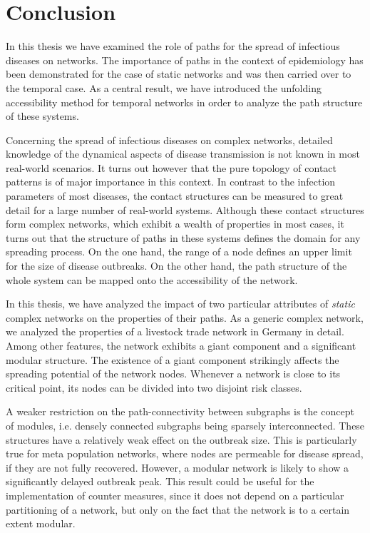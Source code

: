 \chapter{Conclusion}
In this thesis we have examined the role of paths for the spread of infectious diseases on networks.
The importance of paths in the context of epidemiology has been demonstrated for the case of static networks and was then carried over to the temporal case.
As a central result, we have introduced the unfolding accessibility method for temporal networks in order to analyze the path structure of these systems.

Concerning the spread of infectious diseases on complex networks, detailed knowledge of the dynamical aspects of disease transmission is not known in most real-world scenarios.
It turns out however that the pure topology of contact patterns is of major importance in this context.
In contrast to the infection parameters of most diseases, the contact structures can be measured to great detail for a large number of real-world systems.
Although these contact structures form complex networks, which exhibit a wealth of properties in most cases, it turns out that the structure of paths in these systems defines the domain for any spreading process.
On the one hand, the range of a node defines an upper limit for the size of disease outbreaks.
On the other hand, the path structure of the whole system can be mapped onto the accessibility of the network.

In this thesis, we have analyzed the impact of two particular attributes of \emph{static} complex networks on the properties of their paths.
As a generic complex network, we analyzed the properties of a livestock trade network in Germany in detail.
Among other features, the network exhibits a giant component and a significant modular structure.
The existence of a giant component strikingly affects the spreading potential of the network nodes.
Whenever a network is close to its critical point, its nodes can be divided into two disjoint risk classes.

A weaker restriction on the path-connectivity between subgraphs is the concept of modules, i.e. densely connected subgraphs being sparsely interconnected.
These structures have a relatively weak effect on the outbreak size.
This is particularly true for meta population networks, where nodes are permeable for disease spread, if they are not fully recovered.
However, a modular network is likely to show a significantly delayed outbreak peak.
This result could be useful for the implementation of counter measures, since it does not depend on a particular partitioning of a network, but only on the fact that the network is to a certain extent modular.

